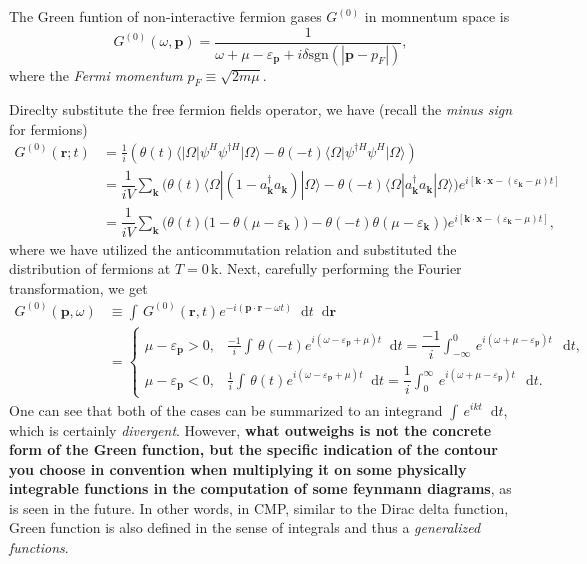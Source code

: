 \documentclass[b5paper,10pt,UTF8]{book}
\newcommand*\dd{\mathop{}\!\mathrm{d}}
\numberwithin{equation}{section}
\begin{document}
			\begin{Proposition}
				The Green funtion of non-interactive fermion gases $G^{(0)}$ in momnentum space is
				\begin{equation}\label{2.3.5}
					G^{(0)}(\omega,\bm{p})=\dfrac{1}{\omega+\mu-\varepsilon_{\bm{p}}+i\delta\mathrm{sgn}(|\bm{p}-p_F|)},
				\end{equation}
				where the \emph{Fermi momentum} $p_F\equiv\sqrt{2m\mu}$.
			\end{Proposition}
			\begin{Proof}
			Direclty substitute the free fermion fields operator, we have (recall the \emph{minus sign} for fermions)
				\begin{align*}
					G^{(0)}(\bm{r};t)&=\frac{1}{i}\left(\theta(t)\langle|\Omega|\psi^H\psi^{\dagger H}|\Omega\rangle-\theta(-t)\langle\Omega|\psi^{\dagger H}\psi^H|\Omega\rangle\right)\\
					&=\dfrac{1}{iV}\sum_{\bm{k}}\bigg(\theta(t)\langle\Omega|(1-a_{\bm{k}}^\dagger a_{\bm{k}})|\Omega\rangle-\theta(-t)\langle\Omega|a_{\bm{k}}^\dagger a_{\bm{k}}|\Omega\rangle\bigg)e^{i[\bm{k\cdot x}-(\varepsilon_{\bm{k}}-\mu)t]}\\
					&=\dfrac{1}{iV}\sum_{\bm{k}}\bigg(\theta(t)\big(1-\theta(\mu-\varepsilon_{\bm{k}})\big)-\theta(-t)\theta(\mu-\varepsilon_{\bm{k}})\bigg)e^{i[\bm{k\cdot x}-(\varepsilon_{\bm{k}}-\mu)t]},
				\end{align*}
				where we have utilized the anticommutation relation and substituted the distribution of fermions at $T=0\,\mathrm{k}$. Next, carefully performing the Fourier transformation, we get 
				\begin{align*}
					G^{(0)}(\bm{p},\omega)&\equiv\int\,G^{(0)}(\bm{r},t)e^{-i(\bm{p\cdot r}-\omega t)}\dd t\dd\bm{r}\\
					&=	\begin{cases}
							\displaystyle\mu-\varepsilon_{\bm{p}}>0,&\displaystyle\frac{-1}{i}\int\,\theta(-t)e^{i(\omega-\varepsilon_{\bm p}+\mu)t}\dd t=\dfrac{-1}{i}\int_{-\infty}^0\,e^{i(\omega+\mu-\varepsilon_{\bm p})t}\,\dd t,\\[0.7pc]
							\displaystyle\mu-\varepsilon_{\bm{p}}<0,&\displaystyle\frac{1}{i}\int\,\theta(t)e^{i(\omega-\varepsilon_{\bm p}+\mu)t}\dd t=\dfrac{1}{i}\int_0^\infty\,e^{i(\omega+\mu-\varepsilon_{\bm p})t}\,\dd t.
						\end{cases}
				\end{align*}
				One can see that both of the cases can be summarized to an integrand $\int\,e^{ikt}\dd t$, which is certainly \emph{divergent}. However, \textbf{what outweighs is not the concrete form of the Green function, but the specific indication of the contour you choose in convention when multiplying it on some physically integrable functions in the computation of some feynmann diagrams}, as is seen in the future. In other words, in CMP, similar to the Dirac delta function, Green function is also defined in the sense of integrals and thus a \emph{generalized functions}.\par

\end{Proof}
\end{document}
